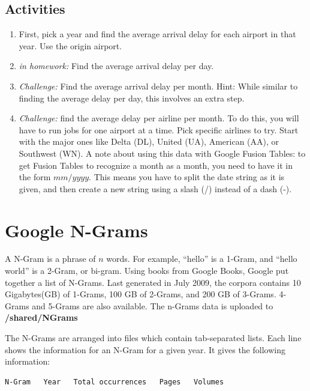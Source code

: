 \documentclass[letterpaper,10pt,openany,oneside]{sphinxmanual}
\begin{document}
\subsection{Activities}
\label{WmrActivities/WmrActivities:id3}\begin{enumerate}
\item {} 
First, pick a year and find the average arrival delay for each
airport in that year. Use the origin airport.

\item {} 
\emph{in homework:} Find the average arrival delay per day.

\item {} 
\emph{Challenge:} Find the average arrival delay per month. Hint:
While similar to finding the average delay per day, this involves
an extra step.

\item {} 
\emph{Challenge:} find the average delay per airline per month. To do
this, you will have to run jobs for one airport at a time. Pick
specific airlines to try. Start with the major ones like Delta
(DL), United (UA), American (AA), or Southwest (WN). A note about
using this data with Google Fusion Tables: to get Fusion Tables to
recognize a month as a month, you need to have it in the form
$mm/yyyy$. This means you have to split the date string as
it is given, and then create a new string using a slash (/) instead
of a dash (-).

\end{enumerate}


\section{Google N-Grams}
\label{WmrActivities/WmrActivities:google-n-grams}
A N-Gram is a phrase of $n$ words. For example, ``hello'' is
a 1-Gram, and ``hello world'' is a 2-Gram, or bi-gram. Using books
from Google Books, Google put together a list of N-Grams. Last
generated in July 2009, the corpora contains 10 Gigabytes(GB) of
1-Grams, 100 GB of 2-Grams, and 200 GB of 3-Grams. 4-Grams and
5-Grams are also available. The n-Grams data is uploaded to \textbf{/shared/NGrams}

The N-Grams are arranged into files
which contain tab-separated lists. Each line shows the information
for an N-Gram for a given year. It gives the following information:

\begin{Verbatim}[commandchars=\\\{\}]
N-Gram   Year   Total occurrences   Pages   Volumes
\end{Verbatim}
\end{document}
